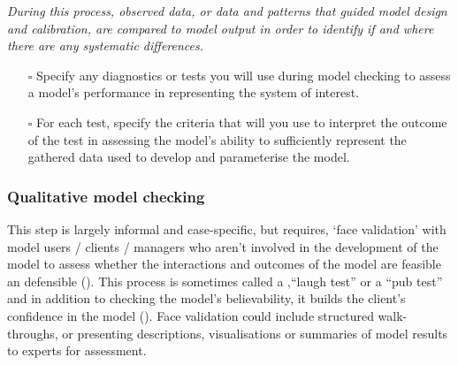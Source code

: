 \documentclass[
]{article}
\providecommand{\tightlist}{%
  \setlength{\itemsep}{0pt}\setlength{\parskip}{0pt}}\usepackage{longtable,booktabs,array}
\begin{document}
\begin{tcolorbox}[enhanced jigsaw, opacityback=0, left=2mm, opacitybacktitle=0.6, breakable, toptitle=1mm, rightrule=.15mm, titlerule=0mm, leftrule=.75mm, title=\textcolor{quarto-callout-caution-color}{\faFire}\hspace{0.5em}{Preregistration Item}, colback=white, arc=.35mm, bottomtitle=1mm, bottomrule=.15mm, colframe=quarto-callout-caution-color-frame, coltitle=black, colbacktitle=quarto-callout-caution-color!10!white, toprule=.15mm]

\emph{During this process, observed data, or data and patterns that
guided model design and calibration, are compared to model output in
order to identify if and where there are any systematic differences.}

\begin{itemize}
\tightlist
\item[$\square$]
  Specify any diagnostics or tests you will use during model checking to
  assess a model's performance in representing the system of interest.
\item[$\square$]
  For each test, specify the criteria that will you use to interpret the
  outcome of the test in assessing the model's ability to sufficiently
  represent the gathered data used to develop and parameterise the
  model.
\end{itemize}

\end{tcolorbox}

\subsubsection{Qualitative model
checking}\label{qualitative-model-checking}

\begin{tcolorbox}[enhanced jigsaw, opacityback=0, left=2mm, opacitybacktitle=0.6, breakable, toptitle=1mm, rightrule=.15mm, titlerule=0mm, leftrule=.75mm, title=\textcolor{quarto-callout-note-color}{\faInfo}\hspace{0.5em}{Explanation}, colback=white, arc=.35mm, bottomtitle=1mm, bottomrule=.15mm, colframe=quarto-callout-note-color-frame, coltitle=black, colbacktitle=quarto-callout-note-color!10!white, toprule=.15mm]

This step is largely informal and case-specific, but requires‚ `face
validation' with model users / clients / managers who aren't involved in
the development of the model to assess whether the interactions and
outcomes of the model are feasible an defensible
(). This process is
sometimes called a ‚``laugh test'' or a ``pub test'' and in addition to
checking the model's believability, it builds the client's confidence in
the model (). Face
validation could include structured walk-throughs, or presenting
descriptions, visualisations or summaries of model results to experts
for assessment.

\end{tcolorbox}
\end{document}
